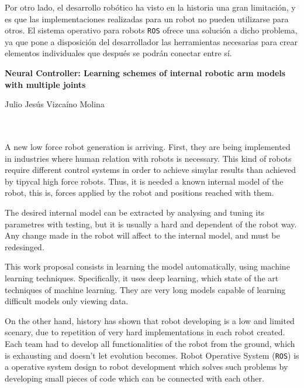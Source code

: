 Por otro lado, el desarrollo robótico ha visto en la historia una gran limitación, y es que las implementaciones realizadas para un robot no pueden utilizarse para otros. El sistema operativo para robots \texttt{ROS} ofrece una solución a dicho problema, ya que pone a disposición del desarrollador las herramientas necesarias para crear elementos individuales que después se podrán conectar entre sí.

\cleardoublepage


\thispagestyle{empty}


\begin{center}
{\large\bfseries Neural Controller: Learning schemes of internal robotic arm models with multiple joints}\\
\end{center}
\begin{center}
Julio Jesús Vizcaíno Molina\\
\end{center}

\\

\vspace{0.7cm}
\\

A new low force robot generation is arriving. First, they are being implemented in industries where human relation with robots is necessary. This kind of robots require different control systems in order to achieve simylar results than achieved by tipycal high force robots. Thus, it is needed a known internal model of the robot, this is, forces applied by the robot and positions reached with them.

The desired internal model can be extracted by analysing and tuning its parametres with testing, but it is usually a hard and dependent of the robot way. Any change made in the robot will affect to the internal model, and must be redesinged.

This work proposal consists in learning the model automatically, using machine learning techniques. Specifically, it uses deep learning, which state of the art techniques of machine learning. They are very long models capable of learning difficult models only viewing data.

On the other hand, history has shown that robot developing is a low and limited scenary, due to repetition of very hard implementations in each robot created. Each team had to develop all functionalities of the robot from the ground, which is exhausting and doesn't let evolution becomes. Robot Operative System (\texttt{ROS}) is a operative system design to robot development which solves such problems by developing small pieces of code which can be connected with each other.

